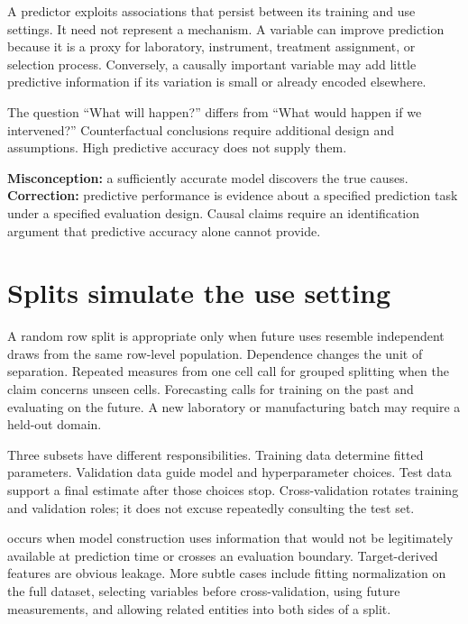A predictor exploits associations that persist between its training and use
settings. It need not represent a mechanism. A variable can improve prediction
because it is a proxy for laboratory, instrument, treatment assignment, or
selection process. Conversely, a causally important variable may add little
predictive information if its variation is small or already encoded elsewhere.

The question ``What will happen?'' differs from ``What would happen if we
intervened?'' Counterfactual conclusions require additional design and
assumptions. High predictive accuracy does not supply them.

\begin{misconceptionbox}
\textbf{Misconception:} a sufficiently accurate model discovers the true
causes. \textbf{Correction:} predictive performance is evidence about a
specified prediction task under a specified evaluation design. Causal claims
require an identification argument that predictive accuracy alone cannot
provide.
\end{misconceptionbox}

\section{Splits simulate the use setting}

A random row split is appropriate only when future uses resemble independent
draws from the same row-level population. Dependence changes the unit of
separation. Repeated measures from one cell call for grouped splitting when the
claim concerns unseen cells. Forecasting calls for training on the past and
evaluating on the future. A new laboratory or manufacturing batch may require a
held-out domain.

Three subsets have different responsibilities. Training data determine fitted
parameters. Validation data guide model and hyperparameter choices. Test data
support a final estimate after those choices stop. Cross-validation rotates
training and validation roles; it does not excuse repeatedly consulting the
test set.

 occurs when model construction uses information that would not
be legitimately available at prediction time or crosses an evaluation
boundary. Target-derived features are obvious leakage. More subtle cases
include fitting normalization on the full dataset, selecting variables before
cross-validation, using future measurements, and allowing related entities into
both sides of a split.

